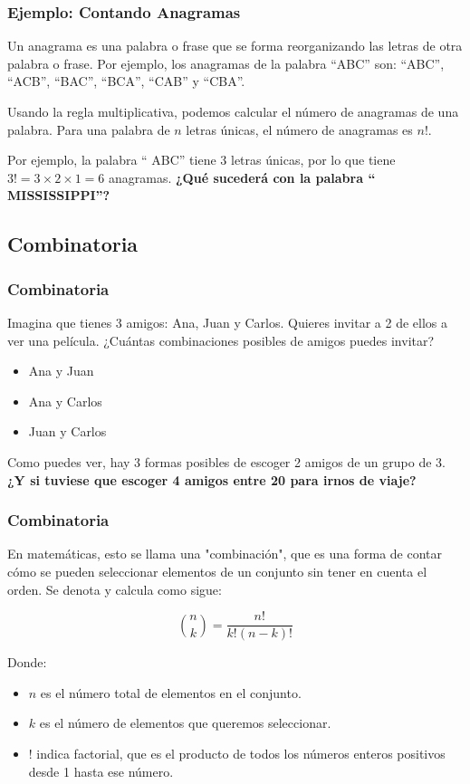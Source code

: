 \documentclass[aspectratio=169]{beamer}
\begin{document}
\begin{frame}
\frametitle{Ejemplo: Contando Anagramas}
Un anagrama es una palabra o frase que se forma reorganizando las letras de otra palabra o frase. Por ejemplo, los anagramas de la palabra ``ABC'' son: ``ABC'', ``ACB'', ``BAC'', ``BCA'', ``CAB'' y ``CBA''.

\vfill

Usando la regla multiplicativa, podemos calcular el número de anagramas de una palabra. Para una palabra de \(n\) letras únicas, el número de anagramas es \(n!\).

\vfill

Por ejemplo, la palabra `` ABC'' tiene 3 letras únicas, por lo que tiene \(3! = 3 \times 2 \times 1 = 6\) anagramas. {\bf ¿Qué sucederá con la palabra `` MISSISSIPPI''?}

\end{frame}



\subsection{Combinatoria}
\begin{frame}
\frametitle{Combinatoria}
Imagina que tienes 3 amigos: Ana, Juan y Carlos. Quieres invitar a 2 de ellos a ver una película. ¿Cuántas combinaciones posibles de amigos puedes invitar?

\begin{itemize}
\item Ana y Juan
\item Ana y Carlos
\item Juan y Carlos
\end{itemize}

\bigskip

Como puedes ver, hay 3 formas posibles de escoger 2 amigos de un grupo de 3. {\bf ¿Y si tuviese que escoger 4 amigos entre 20 para irnos de viaje?}
\end{frame}

\begin{frame}
\frametitle{Combinatoria}
En matemáticas, esto se llama una "combinación", que es una forma de contar cómo se pueden seleccionar elementos de un conjunto sin tener en cuenta el orden. Se denota y calcula como sigue:

\[
\binom{n}{k} = \frac{n!}{k!(n-k)!}
\]

Donde:
\begin{itemize}
\item \(n\) es el número total de elementos en el conjunto.
\item \(k\) es el número de elementos que queremos seleccionar.
\item \(!\) indica factorial, que es el producto de todos los números enteros positivos desde 1 hasta ese número.
\end{itemize}
\end{frame}
\end{document}
